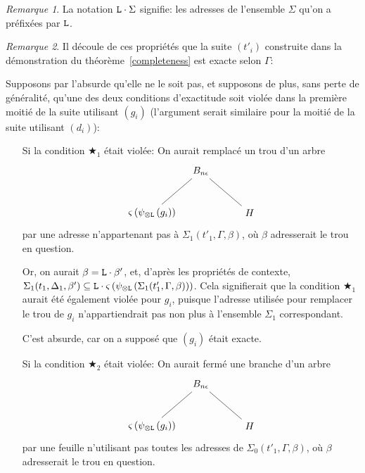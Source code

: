 \documentclass[11pt,a4paper]{article}
\theoremstyle{plain}
\theoremstyle{definition}
\theoremstyle{remark}
\newtheorem{remark}{Remarque}
\newcommand*{\tensor}{\otimes}
\newcommand*{\someperm}{\varsigma}
\newcommand*{\sequent}{\Gamma}
\newcommand*{\sequentbis}{\Delta}
\newcommand*{\Left}{\textnormal{\texttt{L}}}
\newcommand*{\unknown}{H}
\newcommand*{\lowapprox}{\ensuremath{\Sigma_0}}
\newcommand*{\highapprox}{\ensuremath{\Sigma_1}}
\newcommand*{\exactcond}{\bigstar_1}
\newcommand*{\exactcondbis}{\bigstar_2}
\begin{document}
\begin{remark}
    La notation $\Left \cdot \Sigma$ signifie: les adresses de l'ensemble $\Sigma$ qu'on a préfixées par $\Left$.
\end{remark}

\begin{remark}
    Il découle de ces propriétés que la suite $(t'_i)$ construite dans la démonstration du théorème~\ref{completeness} est exacte selon $\sequent$:

    Supposons par l'absurde qu'elle ne le soit pas, et supposons de plus, sans perte de généralité, qu'une des deux conditions d'exactitude soit violée dans la première moitié de la suite utilisant $(g_i)$ (l'argument serait similaire pour la moitié de la suite utilisant $(d_i)$):

    \begin{itemize}
        \item[Si la condition $\exactcond$ était violée:] On aurait remplacé un trou d'un arbre 
            \begin{equation*}
            \begin{tikzpicture}%
            [level 1/.style={sibling distance=3.5cm}]
            \node {$B_{n \epsilon}$}
                child {node {$\someperm \left( \psi_{\tensor\Left} \left(
                g_i\right) \right)$}}
                child {node {$\unknown$}
            };
            \end{tikzpicture}
            \end{equation*}
            par une adresse n'appartenant pas à $\highapprox(t'_1, \sequent, \beta)$, où $\beta$ adresserait le trou en question. 
            
            Or, on aurait $\beta = \Left \cdot \beta'$, et, d'après les propriétés de contexte, $\highapprox(t_1, \sequentbis_1, \beta') \subseteq \Left \cdot \someperm \left( \psi_{\tensor\Left} \left(\highapprox(t'_1, \sequent, \beta)\right) \right)$. Cela signifierait que la condition $\exactcond$ aurait été également violée pour $g_i$, puisque l'adresse utilisée pour remplacer le trou de $g_i$ n'appartiendrait pas non plus à l'ensemble $\highapprox$ correspondant. 
            
            C'est absurde, car on a supposé que $(g_i)$ était exacte.

        \item[Si la condition $\exactcondbis$ était violée:] On aurait fermé une branche d'un arbre 
            \begin{equation*}
            \begin{tikzpicture}%
            [level 1/.style={sibling distance=3.5cm}]
            \node {$B_{n \epsilon}$}
                child {node {$\someperm \left( \psi_{\tensor\Left} \left(
                g_i\right) \right)$}}
                child {node {$\unknown$}
            };
            \end{tikzpicture}
            \end{equation*}
            par une feuille n'utilisant pas toutes les adresses de $\lowapprox(t'_1, \sequent, \beta)$, où $\beta$ adresserait le trou en question. 
            

\end{itemize}
\end{remark}
\end{document}
